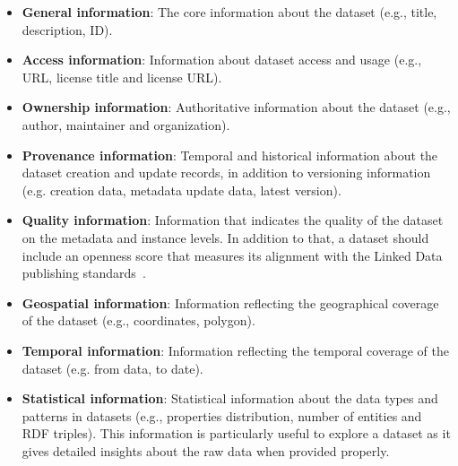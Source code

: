 \documentclass[runningheads,a4paper]{llncs}
\begin{document}
\begin{itemize}
\item \textbf{General information}: The core information about the dataset (e.g., title, description, ID).
\item \textbf{Access information}: Information about dataset access and usage (e.g., URL, license title and license URL).
\item \textbf{Ownership information}: Authoritative information about the dataset (e.g., author, maintainer and organization).
\item \textbf{Provenance information}: Temporal and historical information about the dataset creation and update records, in addition to versioning information (e.g. creation data, metadata update data, latest version).
\item \textbf{Quality information}: Information that indicates the quality of the dataset on the metadata and instance levels. In addition to that, a dataset should include an openness score that measures its alignment with the Linked Data publishing standards~\cite{tim:linkedata}.
\item \textbf{Geospatial information}: Information reflecting the geographical coverage of the dataset (e.g., coordinates, polygon).
\item \textbf{Temporal information}: Information reflecting the temporal coverage of the dataset (e.g. from data, to date).
\item \textbf{Statistical information}: Statistical information about the data types and patterns in datasets (e.g., properties distribution, number of entities and RDF triples). This information is particularly useful to explore a dataset as it gives detailed insights about the raw data when provided properly.
\end{itemize}


\end{document}
